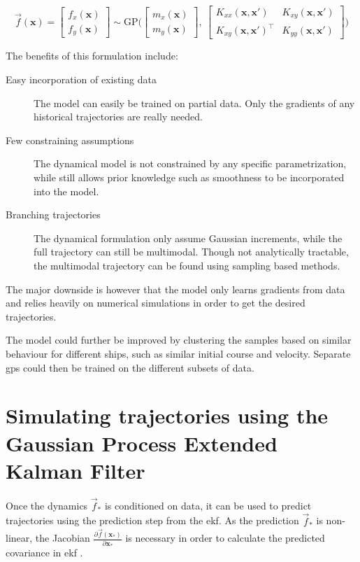 \begin{equation}\label{eq:gp_vec_field}
    \vec{f}(\boldsymbol{x}) = \begin{bmatrix} f_x (\boldsymbol{x})\\ f_y (\boldsymbol{x})\end{bmatrix} \sim \text{GP} \big(\begin{bmatrix} m_x(\boldsymbol{x})\\m_y(\boldsymbol{x})\end{bmatrix}, \ \begin{bmatrix}
    K_{xx}(\boldsymbol{x}, \boldsymbol{x}') & K_{xy}(\boldsymbol{x}, \boldsymbol{x}') \\ K_{xy}(\boldsymbol{x}, \boldsymbol{x}')^\intercal & K_{yy}(\boldsymbol{x}, \boldsymbol{x}')
    \end{bmatrix}\big) 
\end{equation}

The benefits of this formulation include:
\begin{description}
    \item[Easy incorporation of existing data] The model can easily be trained on partial data. Only the gradients of any historical trajectories are really needed.
    \item[Few constraining assumptions] The dynamical model is not constrained by any specific parametrization, while still allows prior knowledge such as smoothness to be incorporated into the model.
    \item[Branching trajectories] The dynamical formulation only assume Gaussian increments, while the full trajectory can still be multimodal. Though not analytically tractable, the multimodal trajectory can be found using sampling based methods. 
\end{description}

The major downside is however that the model only learns gradients from data and relies heavily on numerical simulations in order to get the desired trajectories.

The model could further be improved by clustering the samples based on similar behaviour for different ships, such as similar initial course and velocity. Separate \acrshort{gp}s could then be trained on the different subsets of data.

\section{Simulating trajectories using the Gaussian Process Extended Kalman Filter}
Once the dynamics $\vec{f}_*$ is conditioned on data, it can be used to predict trajectories using the prediction step from the \acrshort{ekf}. As the prediction $\vec{f}_*$ is non-linear, the Jacobian $\frac{\partial \vec{f}(\boldsymbol{x}_*)}{\partial \boldsymbol{x}_*}$ is necessary in order to calculate the predicted covariance in \acrshort{ekf} \cite{gpekf}.

